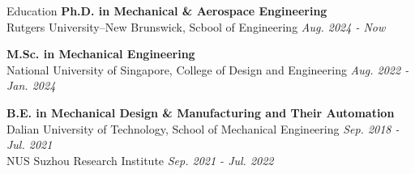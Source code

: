 \documentclass{resume} %
\begin{document}
\begin{rSection}{Education}
{\bf Ph.D. in Mechanical \& Aerospace Engineering} \\
Rutgers University–New Brunswick, Scbool of Engineering \hfill {\em Aug. 2024 - Now}\\	

\vspace{-1em}

{\bf M.Sc. in Mechanical Engineering} \\
National University of Singapore, College of Design and Engineering \hfill {\em Aug. 2022 - Jan. 2024}\\

\vspace{-1em}

{\bf B.E. in Mechanical Design \& Manufacturing and Their Automation} \\
Dalian University of Technology, School of Mechanical Engineering \hfill {\em Sep. 2018 - Jul. 2021}\\
NUS Suzhou Research Institute
\hfill {\em Sep. 2021 - Jul. 2022}\\
\end{rSection}

\vspace{-1em}


\end{document}
